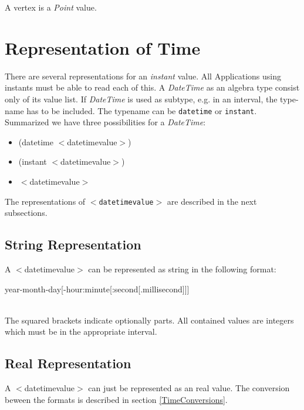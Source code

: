 \documentclass[english,a4paper]{article}
\begin{document}
A vertex is a \emph{Point} value.



\section{Representation of Time}
There are several representations for an \emph{instant} value.
All Applications using instants must be able to read each of this.
A \emph{DateTime} as an algebra type consist only of its value list. 
If \emph{DateTime} is used as subtype, e.g. in an interval, the
type-name has to be included. The typename can be {\tt datetime} or
{\tt instant}. Summarized we have three possibilities for a \emph{DateTime}:
\begin{tt}
  \begin{small}
     \begin{itemize}
       \item (datetime $<$datetimevalue$>$) \\
       \item (instant $<$datetimevalue$>$)  \\
       \item $<$datetimevalue$>$
      \end{itemize}
  \end{small}
\end{tt}

The representations of {\tt $<$datetimevalue$>$} are described
in the next subsections.

\subsection{String Representation}
\label{StringRepOfTime}
A $<$datetimevalue$>$ can be represented as string in the following
format: \\
\begin{tt}
  \begin{small}
      year-month-day[-hour:minute[:second[.millisecond]]]
  \end{small}
\end{tt}\\
The squared brackets indicate optionally parts. All contained values
are integers which must be in the appropriate interval. 

\subsection{Real Representation}
A $<$datetimevalue$>$ can just be represented as an real value. 
The conversion beween the formats is described in section 
\ref{TimeConversions}.
\end{document}
